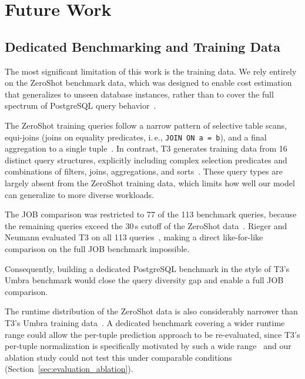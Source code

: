
\chapter{Future Work}\label{chapter:future_work}

\section{Dedicated Benchmarking and Training Data}

The most significant limitation of this work is the training data.
We rely entirely on the ZeroShot benchmark data,
which was designed to enable cost estimation that generalizes to unseen database instances,
rather than to cover the full spectrum of PostgreSQL query behavior~\parencite{zeroshot}.

The ZeroShot training queries follow a narrow pattern of selective table scans,
equi-joins (joins on equality predicates, i.\,e., \texttt{JOIN ON a = b}), and a final aggregation to a single tuple~\parencite{zeroshot}.
In contrast, T3 generates training data from 16 distinct query structures,
explicitly including complex selection predicates
and combinations of filters, joins, aggregations, and sorts~\parencite{t3}.
These query types are largely absent from the ZeroShot training data,
which limits how well our model can generalize to more diverse workloads.

The JOB comparison was restricted to 77 of the 113 benchmark queries,
because the remaining queries exceed the 30\,s cutoff of the ZeroShot data~\parencite{zeroshot}.
Rieger and Neumann evaluated T3 on all 113 queries~\parencite{t3},
making a direct like-for-like comparison on the full JOB benchmark impossible.

Consequently, building a dedicated PostgreSQL benchmark in the style of T3's Umbra benchmark
would close the query diversity gap and enable a full JOB comparison.

The runtime distribution of the ZeroShot data is also considerably narrower than T3's Umbra training data~\parencite{t3}.
A dedicated benchmark covering a wider runtime range could allow the per-tuple prediction approach to be re-evaluated,
since T3's per-tuple normalization is specifically motivated by such a wide range~\parencite{t3}
and our ablation study could not test this under comparable conditions (Section~\ref{sec:evaluation_ablation}).

